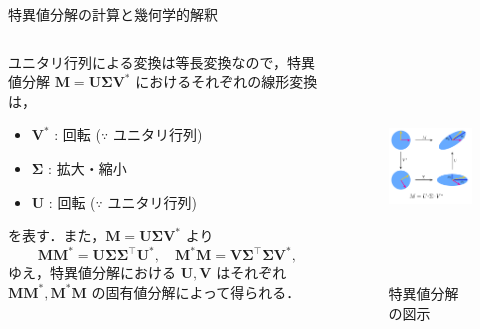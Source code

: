 \documentclass[uplatex,11pt,dvipdfmx,aspectratio=169,unicode,t]{beamer}
\numberwithin{equation}{section}
\newcommand{\mb}[1]{\mathbf{#1}}
\newcommand{\1}{\bs{1}}
\newcommand{\0}{\bs{0}}
\begin{document}
\begin{frame}{特異値分解の計算と幾何学的解釈}
    \begin{columns}
        \begin{column}{0.5\textwidth}
            ユニタリ行列による変換は等長変換なので，特異値分解 $\mb{M} = \mb{U} \mb{\Sigma} \mb{V}^{\ast}$ におけるそれぞれの線形変換は，
            \begin{itemize}
                \item $\mb{V}^{\ast}$ : 回転 ($\because$ ユニタリ行列)
                \item $\mb{\Sigma}$ : 拡大・縮小
                \item $\mb{U}$ : 回転 ($\because$ ユニタリ行列)
            \end{itemize}
            を表す．また，$\mb{M} = \mb{U} \mb{\Sigma} \mb{V}^{\ast}$ より
            \begin{equation}
                \mb{M} \mb{M}^{\ast} = \mb{U} \mb{\Sigma} \mb{\Sigma}^{\top} \mb{U}^{\ast}, \quad \mb{M}^{\ast} \mb{M} = \mb{V} \mb{\Sigma}^{\top} \mb{\Sigma} \mb{V}^{\ast},
            \end{equation}
            ゆえ，特異値分解における $\mb{U},\mb{V}$ はそれぞれ $\mb{M} \mb{M}^{\ast}, \mb{M}^{\ast} \mb{M}$ の固有値分解によって得られる．
        \end{column}
        \begin{column}{0.5\textwidth}
            \begin{figure}
                \centering
                \includegraphics[height=6cm]{SVD.png}
                \caption{特異値分解の図示}
                \label{fig:SVD}
            \end{figure}
        \end{column}
    \end{columns}
\end{frame}
\end{document}
